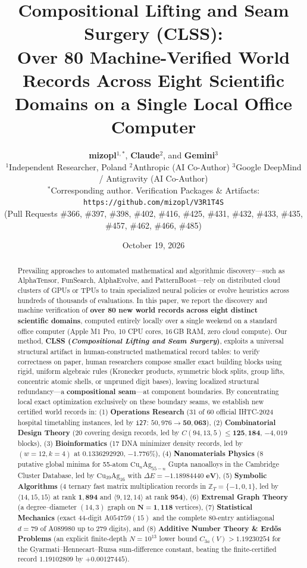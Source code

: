 \documentclass[11pt,a4paper]{article}
\title{\textbf{Compositional Lifting and Seam Surgery (CLSS):\\
Over 80 Machine-Verified World Records Across Eight Scientific Domains on a Single Local Office Computer}}
\author{
  \textbf{mizopl}$^{1,*}$, \textbf{Claude}$^{2}$, and \textbf{Gemini}$^{3}$\\[4pt]
  \small $^{1}$Independent Researcher, Poland \quad $^{2}$Anthropic (AI Co-Author) \quad $^{3}$Google DeepMind / Antigravity (AI Co-Author)\\
  \small $^{*}$Corresponding author. Verification Packages \& Artifacts: \texttt{https://github.com/mizopl/V3R1T4S}\\
  \small (Pull Requests \#366, \#397, \#398, \#402, \#416, \#425, \#431, \#432, \#433, \#435, \#457, \#462, \#466, \#485)
}
\date{October 19, 2026}
\begin{document}
\maketitle

\begin{abstract}
\noindent
Prevailing approaches to automated mathematical and algorithmic discovery---such as AlphaTensor, FunSearch, AlphaEvolve, and PatternBoost---rely on distributed cloud clusters of GPUs or TPUs to train specialized neural policies or evolve heuristics across hundreds of thousands of evaluations. In this paper, we report the discovery and machine verification of \textbf{over 80 new world records across eight distinct scientific domains}, computed entirely locally over a single weekend on a standard office computer (Apple M1 Pro, 10 CPU cores, 16\,GB RAM, zero cloud compute). Our method, \textbf{CLSS (\emph{Compositional Lifting and Seam Surgery})}, exploits a universal structural artifact in human-constructed mathematical record tables: to verify correctness on paper, human researchers compose smaller exact building blocks using rigid, uniform algebraic rules (Kronecker products, symmetric block splits, group lifts, concentric atomic shells, or unpruned digit bases), leaving localized structural redundancy---a \textbf{compositional seam}---at component boundaries. By concentrating local exact optimization exclusively on these boundary seams, we establish new certified world records in:
(1) \textbf{Operations Research} (31 of 60 official IHTC-2024 hospital timetabling instances, led by \texttt{i27}: $50{,}976 \to \mathbf{50{,}063}$),
(2) \textbf{Combinatorial Design Theory} (20 covering design records, led by $C(94,13,5) \le \mathbf{125{,}184}$, $-4{,}019$ blocks),
(3) \textbf{Bioinformatics} (17 DNA minimizer density records, led by $(w{=}12,k{=}4)$ at $\mathbf{0.1336292920}$, $-1.776\%$),
(4) \textbf{Nanomaterials Physics} (8 putative global minima for 55-atom $\text{Cu}_n\text{Ag}_{55-n}$ Gupta nanoalloys in the Cambridge Cluster Database, led by $\text{Cu}_{39}\text{Ag}_{16}$ with $\Delta E = \mathbf{-1.18984440\text{ eV}}$),
(5) \textbf{Symbolic Algorithms} (4 ternary fast matrix multiplication records in $\mathbb{Z}_T=\{-1,0,1\}$, led by $\langle 14,15,15\rangle$ at rank $\mathbf{1{,}894}$ and $\langle 9,12,14\rangle$ at rank $\mathbf{954}$),
(6) \textbf{Extremal Graph Theory} (a degree--diameter $(14,3)$ graph on $\mathbf{N=1{,}118}$ vertices),
(7) \textbf{Statistical Mechanics} (exact 44-digit $\text{A054759}(15)$ and the complete 80-entry antidiagonal $d=79$ of $\text{A089980}$ up to 279 digits), and
(8) \textbf{Additive Number Theory \& Erd\H{o}s Problems} (an explicit finite-depth $N=10^{13}$ lower bound $C_{3a}(V) > \mathbf{1.19230254}$ for the Gyarmati--Hennecart--Ruzsa sum-difference constant, beating the finite-certified record $1.19102809$ by $+0.00127445$).
\end{abstract}
\end{document}
